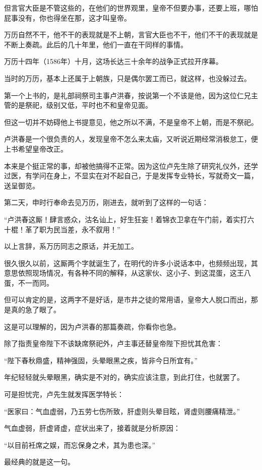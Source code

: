 \begin{multicols}{\theparacolNo}
但言官大臣是不管这些的，在他们的世界观里，皇帝不但要办事，还要上班，哪怕屁事没有，你也得坐在那，这才叫皇帝。

万历自然不干，他不干的表现就是不上朝，言官大臣也不干，他们不干的表现就是不断上奏疏。此后的几十年里，他们一直在干同样的事情。

万历十四年（1586年）十月，这场长达三十余年的战争正式拉开序幕。

当时的万历，基本上还属于上朝族，只是偶尔罢工而已，就这样，也没躲过去。

第一个上书的，是礼部祠祭司主事卢洪春，按说第一个不该是他，因为这位仁兄主管的是祭祀，级别又低，平时也不和皇帝见面。

但这一切并不妨碍他上书提意见，他之所以不满，不是皇帝不上朝，而是不祭祀。

卢洪春是一个很负责的人，发现皇帝不怎么来太庙，又听说近期经常消极怠工，便上书希望皇帝改正。

本来是个挺正常的事，却被他搞得不正常。因为这位卢先生除了研究礼仪外，还学过医，有学问在身上，不显实在对不起自己，于是发挥专业特长，写就奇文一篇，送呈御览。

第二天，申时行奉命去见万历，刚进去，就听到了这样的一句话：

“卢洪春这厮！肆言惑众，沽名讪上，好生狂妄！着锦衣卫拿在午门前，着实打六十棍！革了职为民当差，永不叙用！”

以上言辞，系万历同志之原话，并无加工。

很久很久以前，这厮两个字就诞生了，在明代的许多小说话本中，也频频出现，其意思依照现场情况，有各种不同的解释，从这家伙、这小子、到这混蛋，这王八蛋，不一而同。

但可以肯定的是，这两字不是好话，是市井之徒的常用语，皇帝大人脱口而出，那是真的急了眼了。

这是可以理解的，因为卢洪春的那篇奏疏，你看你也急。

除了指责皇帝陛下不该缺席祭祀外，卢主事还替皇帝陛下担忧其危害：

“陛下春秋鼎盛，精神强固，头晕眼黑之疾，皆非今日所宜有。”

年纪轻轻就头晕眼黑，确实是不对的，确实应该注意，到此打住，也就罢了。

可是担忧完，卢先生就发挥医学特长：

“医家曰：气血虚弱，乃五劳七伤所致，肝虚则头晕目眩，肾虚则腰痛精泄。”

气血虚弱，肝虚肾虚，症状出来了，接着就是分析原因：

“以目前衽席之娱，而忘保身之术，其为患也深。”

最经典的就是这一句。


\end{multicols}

